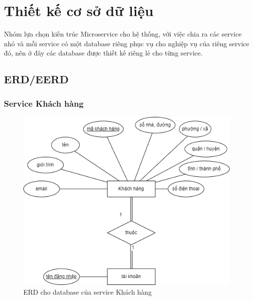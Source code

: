 \section{Thiết kế cơ sở dữ liệu}
\par Nhóm lựa chọn kiến trúc Microservice cho hệ thống, với việc chia ra các service nhỏ và mỗi service có một database riêng phục vụ cho nghiệp vụ của riêng service đó, nên ở đây các database được thiết kế riêng lẻ cho từng service.

\subsection{ERD/EERD}
\subsubsection{Service Khách hàng}
\begin{figure}[!htp]
    \begin{center}
        \includegraphics[width=1\textwidth]{img/database/erd/eerd-customer.png}
        \newline
        \caption{ERD cho database của service Khách hàng}
    \end{center}
\end{figure}

